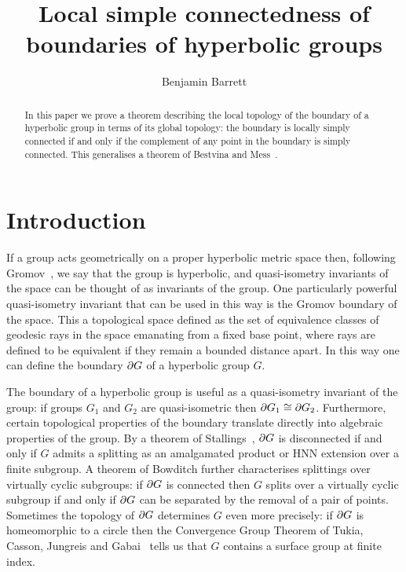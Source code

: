\documentclass[a4paper]{article}
\title{Local simple connectedness of boundaries of hyperbolic groups}
\author{Benjamin Barrett}
\begin{document}
\maketitle

\begin{abstract}
  In this paper we prove a theorem describing the local topology of the
  boundary of a hyperbolic group in terms of its global topology: the boundary
  is locally simply connected if and only if the complement of any point in the
  boundary is simply connected. This generalises a theorem of Bestvina and
  Mess~\cite{bestvinamess91}.
\end{abstract}

\section{Introduction}

If a group acts geometrically on a proper hyperbolic metric space then,
following Gromov~\cite{gromov87}, we say that the group is hyperbolic, and
quasi-isometry invariants of the space can be thought of as invariants of the
group. One particularly powerful quasi-isometry invariant that can be used in
this way is the Gromov boundary of the space. This a topological space defined
as the set of equivalence classes of geodesic rays in the space emanating from
a fixed base point, where rays are defined to be equivalent if they remain a
bounded distance apart. In this way one can define the boundary $\partial G$
of a hyperbolic group $G$.

The boundary of a hyperbolic group is useful as a quasi-isometry invariant of
the group: if groups $G_1$ and $G_2$ are quasi-isometric then $\partial G_1
\cong \partial G_2$. Furthermore, certain topological properties of the
boundary translate directly into algebraic properties of the group. By a
theorem of Stallings~\cite{stallings68}, $\partial G$ is disconnected if and
only if $G$ admits a splitting as an amalgamated product or HNN extension over
a finite subgroup. A theorem of Bowditch further characterises splittings over
virtually cyclic subgroups: if $\partial G$ is connected then $G$ splits over
a virtually cyclic subgroup if and only if $\partial G$ can be separated by
the removal of a pair of points. Sometimes the topology of $\partial G$
determines $G$ even more precisely: if $\partial G$ is homeomorphic to a
circle then the Convergence Group Theorem of Tukia, Casson, Jungreis and
Gabai~\cite{tukia88,cassonjungreis94,gabai92} tells us that $G$ contains a
surface group at finite index.
\end{document}

